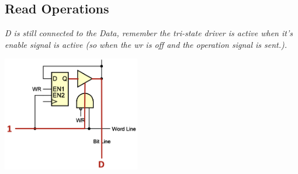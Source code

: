 \hfill  
\vline
\hfill
\begin{minipage}[htp]{0.45\textwidth}
    \subsection{Read Operations}
    \textit{D is still connected to the Data, remember the tri-state driver is active when it's enable signal is active (so when the wr is off and the operation signal is sent.).} \\ \vspace*{5px}
    \begin{center}
        \includegraphics[width=0.45\textwidth]{chapters/chapter1c/images/read.png}
    \end{center}
\end{minipage}

\vspace*{5px}
